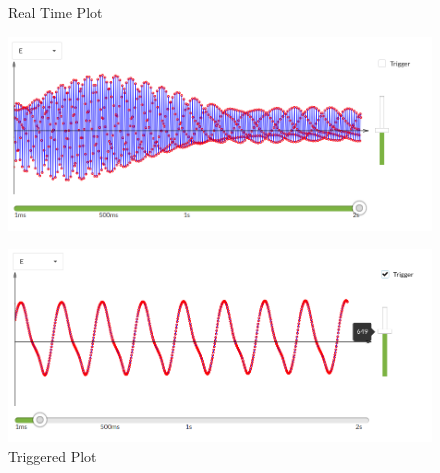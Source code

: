 \begin{figure}[htb]
 \centering
  \begin{minipage}{0.4\textwidth}
    \centering
    \caption{Real Time Plot} \label{plot-real-time}
    \includegraphics[scale=0.22]{images/snapshots/plot-real-time}
  \end{minipage}
  \hfill
  \begin{minipage}{0.4\textwidth}
    \centering
    \caption{Triggered Plot} \label{plot-triggered}
    \includegraphics[scale=0.22]{images/snapshots/plot-trigger-E}
  \end{minipage}
\end{figure}
